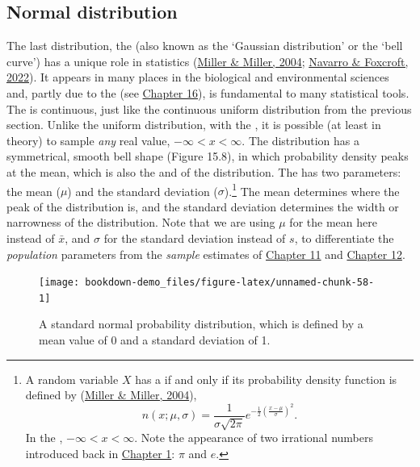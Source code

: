 \documentclass[
  openany]{krantz}
\begin{document}
\hypertarget{normal-distribution}{%
\subsection{Normal distribution}\label{normal-distribution}}

The last distribution, the  (also known as the `Gaussian distribution' or the `bell curve') has a unique role in statistics (\protect\hyperlink{ref-Miller2004}{Miller \& Miller, 2004}; \protect\hyperlink{ref-Navarro2022}{Navarro \& Foxcroft, 2022}).
It appears in many places in the biological and environmental sciences and, partly due to the  (see \protect\hyperlink{Chapter_16}{Chapter 16}), is fundamental to many statistical tools.
The  is continuous, just like the continuous uniform distribution from the previous section.
Unlike the uniform distribution, with the , it is possible (at least in theory) to sample \emph{any} real value, \(-\infty < x < \infty\).
The distribution has a symmetrical, smooth bell shape (Figure 15.8), in which probability density peaks at the mean, which is also the  and  of the distribution.
The  has two parameters: the mean (\(\mu\)) and the standard deviation (\(\sigma\)).\footnote{A random variable \(X\) has a  if and only if its probability density function is defined by (\protect\hyperlink{ref-Miller2004}{Miller \& Miller, 2004}), \[n\left(x; \mu, \sigma\right) = \frac{1}{\sigma\sqrt{2\pi}}e^{-\frac{1}{2}\left(\frac{x - \mu}{\sigma}\right)^{2}}.\] In the , \(-\infty < x < \infty\). Note the appearance of two irrational numbers introduced back in \protect\hyperlink{Chapter_1}{Chapter 1}: \(\pi\) and \(e\).}
The mean determines where the peak of the distribution is, and the standard deviation determines the width or narrowness of the distribution.
Note that we are using \(\mu\) for the mean here instead of \(\bar{x}\), and \(\sigma\) for the standard deviation instead of \(s\), to differentiate the \emph{population} parameters from the \emph{sample} estimates of \protect\hyperlink{Chapter_11}{Chapter 11} and \protect\hyperlink{Chapter_12}{Chapter 12}.

\begin{figure}
\texttt{[image: bookdown-demo\_files/figure-latex/unnamed-chunk-58-1]} \caption{A standard normal probability distribution, which is defined by a mean value of 0 and a standard deviation of 1.}\label{fig:unnamed-chunk-58}
\end{figure}
\end{document}
